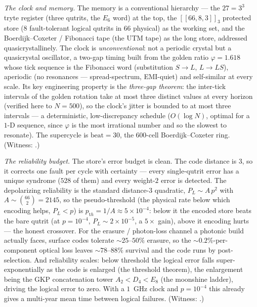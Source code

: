 \documentclass[11pt]{article}
\begin{document}
\emph{The clock and memory.} The memory is a conventional hierarchy --- the $27=3^3$ tryte register
(three qutrits, the $E_6$ word) at the top, the $[\![66,8,3]\!]_3$ protected store ($8$
fault-tolerant logical qutrits in $66$ physical) as the working set, and the Boerdijk--Coxeter /
Fibonacci tape (the UTM tape) as the long store, addressed quasicrystallinely. The clock is
\emph{unconventional}: not a periodic crystal but a quasicrystal oscillator, a two-gap timing built
from the golden ratio $\varphi=1.618$ whose tick sequence is the Fibonacci word (substitution
$S\!\to\!L$, $L\!\to\!LS$), aperiodic (no resonances --- spread-spectrum, EMI-quiet) and self-similar
at every scale. Its key engineering property is the \emph{three-gap theorem}: the inter-tick
intervals of the golden rotation take at most three distinct values at every horizon (verified here
to $N=500$), so the clock's jitter is bounded to at most three intervals --- a deterministic,
low-discrepancy schedule ($O(\log N)$, optimal for a $1$-D sequence, since $\varphi$ is the most
irrational number and so the slowest to resonate). The supercycle is $\mathrm{beat}=30$, the
$600$-cell Boerdijk--Coxeter ring. (Witness: .)

\emph{The reliability budget.} The store's error budget is clean. The code distance is $3$, so it
corrects one fault per cycle with certainty --- every single-qutrit error has a unique syndrome ($528$
of them) and every weight-$2$ error is detected. The depolarizing reliability is the standard
distance-$3$ quadratic, $P_L\sim A\,p^2$ with $A\sim\binom{66}{2}=2145$, so the pseudo-threshold
(the physical rate below which encoding helps, $P_L<p$) is $p_{\mathrm th}=1/A\approx 5\times10^{-4}$:
below it the encoded store beats the bare qutrit (at $p=10^{-4}$, $P_L\sim2\times10^{-5}$, a $5\times$
gain), above it encoding hurts --- the honest crossover. For the erasure / photon-loss channel a
photonic build actually faces, surface codes tolerate $\sim25$--$50\%$ erasure, so the
$\sim0.2\%$-per-component optical loss leaves $\sim78$--$88\%$ survival and the code runs by
post-selection. And reliability scales: below threshold the logical error falls super-exponentially
as the code is enlarged (the threshold theorem), the enlargement being the GKP concatenation tower
$A_2<D_4<E_8$ (the moonshine ladder), driving the logical error to zero. With a $1$~GHz clock and
$p=10^{-4}$ this already gives a multi-year mean time between logical failures. (Witness:
.)
\end{document}

